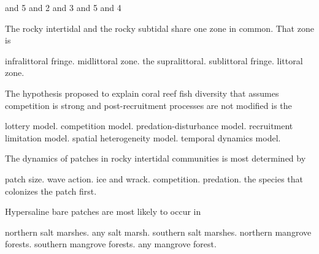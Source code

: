 \begin{choices}
 and 5 %
 and 2 %
 and 3  %
 and 5 %
 and 4 %
\end{choices}

\question
The rocky intertidal and the rocky subtidal share one zone in common. That zone is

\begin{choices}
\choice infralittoral fringe. %
\choice midlittoral zone. %
\correctchoice the supralittoral. %
\choice sublittoral fringe. %
\choice littoral zone. %
\end{choices}

\question
The hypothesis proposed to explain coral reef fish diversity that assumes competition is strong and post-recruitment processes are not modified is the 

\begin{choices}
\correctchoice lottery model. %
\choice competition model. %
\choice predation-disturbance model. %
\choice recruitment limitation model. %
\choice spatial heterogeneity model. %
\choice temporal dynamics model. %
\end{choices}

\question
The dynamics of patches in rocky intertidal communities is most determined by

\begin{choices}
\correctchoice patch size. %
\choice wave action. %
\choice ice and wrack. %
\choice competition. %
\choice predation. %
\choice the species that colonizes the patch first. %
\end{choices}

\question
Hypersaline bare patches are most likely to occur in

\begin{choices}
\correctchoice northern salt marshes. %
\choice any salt marsh. %
\choice southern salt marshes. %
\choice northern mangrove forests. %
\choice southern mangrove forests. %
\choice any mangrove forest. %
\end{choices}
